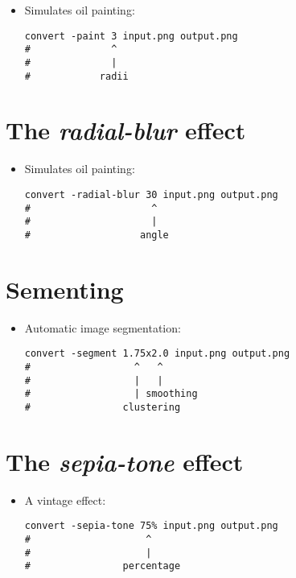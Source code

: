 \begin{itemize}
\item Simulates oil painting:
\begin{lstlisting}
convert -paint 3 input.png output.png
#              ^
#              |
#            radii
\end{lstlisting}

\end{itemize}

\section{The \emph{radial-blur} effect}

\begin{itemize}
\item Simulates oil painting:
\begin{lstlisting}
convert -radial-blur 30 input.png output.png
#                     ^
#                     |
#                   angle
\end{lstlisting}

\end{itemize}


\section{Sementing}

\begin{itemize}
\item Automatic image segmentation:
\begin{lstlisting}
convert -segment 1.75x2.0 input.png output.png
#                  ^   ^
#                  |   |
#                  | smoothing
#                clustering
\end{lstlisting}

\end{itemize}

\section{The \emph{sepia-tone} effect}

\begin{itemize}
\item A vintage effect:
\begin{lstlisting}
convert -sepia-tone 75% input.png output.png
#                    ^
#                    |
#                percentage
\end{lstlisting}

\end{itemize}

